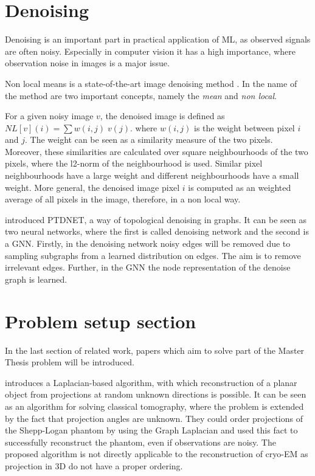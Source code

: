 \section{Denoising}

Denoising is an important part in practical application of ML, as observed signals are often noisy.
Especially in computer vision it has a high importance, where observation noise in images is a major issue.


Non local means is a state-of-the-art image denoising method \cite{noneLocalMean}.
In the name of the method are two important concepts, namely the \textit{mean}
and \textit{non local}.

For a given noisy image $v$, the denoised image is defined as $NL[v](i) = \sum{w(i,j) \; v(j)}$.
where $w(i,j)$ is the weight between pixel $i$ and $j$. The weight can be seen as a similarity measure of the two pixels.
Moreover, these similarities are calculated over square neighbourhoods of the two pixels,
where the l2-norm of the neighbourhood is used.
Similar pixel neighbourhoods have a large weight and different neighbourhoods have a small weight.
More general, the denoised image pixel $i$ is computed as an weighted average of all pixels in the 
image, therefore, in a non local way.

\citet{learningToDrop} introduced PTDNET, a way of topological denoising in graphs.
It can be seen as two neural networks, where the first is called denoising network and the second is a GNN.
Firstly, in the denoising network noisy edges will be removed due to
sampling subgraphs from a learned distribution on edges. The aim is to remove 
irrelevant edges. Further, in the GNN the node representation of the denoise graph is learned.



\section{Problem setup section}
In the last section of related work, papers which aim to solve part of the Master Thesis problem will be introduced.

\citet{LaplaceRandomProjections} introduces a Laplacian-based algorithm, with which 
reconstruction of a planar object from projections at random unknown directions is possible.
It can be seen as an algorithm for solving classical tomography, where the problem is extended
by the fact that projection angles are unknown. 
They could order projections of the Shepp-Logan phantom by using the Graph Laplacian 
and used this fact to successfully reconstruct the phantom, even if observations are noisy. 
The proposed algorithm is not directly applicable to the reconstruction of cryo-EM 
as projection in 3D do not have a proper ordering.


